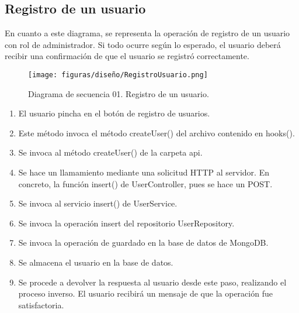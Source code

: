 \subsection{Registro de un usuario}

En cuanto a este diagrama, se representa la operación de registro de un usuario con rol de administrador. Si todo ocurre según lo esperado, el usuario deberá recibir una confirmación de que el usuario se registró correctamente.

\begin{figure}[H]
\centerline{\texttt{[image: figuras/diseño/RegistroUsuario.png]}}
\caption{Diagrama de secuencia 01. Registro de un usuario.}
\label{enlaceDRegistro}
\end{figure}

\begin{enumerate}
    \item El usuario pincha en el botón de registro de usuarios.
    \item Este método invoca el método createUser() del archivo contenido en hooks().
    \item Se invoca al método createUser() de la carpeta api.
    \item Se hace un llamamiento mediante una solicitud HTTP al servidor. En concreto, la función insert() de UserController, pues se hace un POST.
    \item Se invoca al servicio insert() de UserService.
    \item Se invoca la operación insert del repositorio UserRepository.
    \item Se invoca la operación de guardado en la base de datos de MongoDB.
    \item Se almacena el usuario en la base de datos.
    \item Se procede a devolver la respuesta al usuario desde este paso, realizando el proceso inverso. El usuario recibirá un mensaje de que la operación fue satisfactoria.
\end{enumerate}